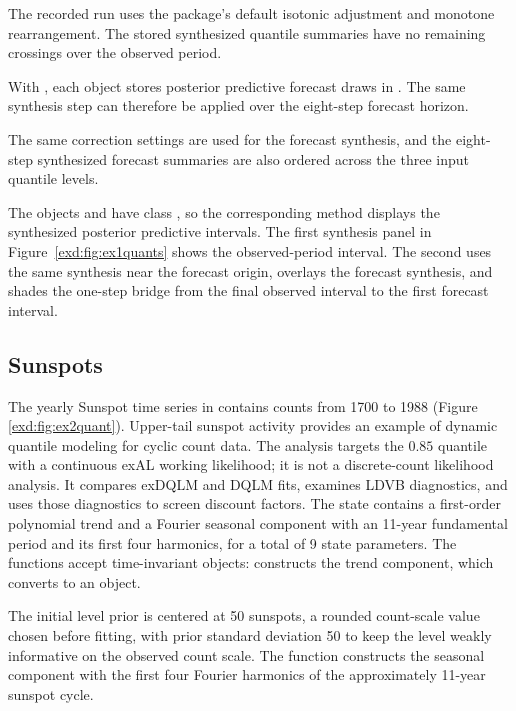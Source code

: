 The recorded run uses the package's default isotonic adjustment and monotone rearrangement. The stored synthesized quantile summaries have no remaining crossings over the observed period.

With , each object stores posterior predictive
forecast draws in . The same synthesis step can therefore be
applied over the eight-step forecast horizon.



The same correction settings are used for the forecast synthesis, and the eight-step synthesized forecast summaries are also ordered across the three input quantile levels.

The objects  and  have class , so the corresponding  method displays the synthesized posterior predictive intervals. The first synthesis panel in Figure~\ref{exd:fig:ex1quants} shows the observed-period interval. The second uses the same synthesis near the forecast origin, overlays the forecast synthesis, and shades the one-step bridge from the final observed interval to the first forecast interval.




\subsection{Sunspots}
\label{exd:sec:ex2}

The yearly Sunspot time series in  contains counts from 1700 to
1988 (Figure \ref{exd:fig:ex2quant}). Upper-tail sunspot activity provides an
example of dynamic quantile modeling for cyclic count data. The analysis
targets the \(0.85\) quantile with a continuous exAL working likelihood; it is
not a discrete-count likelihood analysis. It compares exDQLM and DQLM fits,
examines LDVB diagnostics, and uses those diagnostics to screen discount
factors. The state contains a first-order polynomial trend and a Fourier
seasonal component with an 11-year fundamental period and its first four
harmonics, for a total of 9 state parameters. The  functions accept
time-invariant  objects:  constructs the trend
component, which  converts to an  object.

The initial level prior is centered at 50 sunspots, a rounded count-scale value chosen before fitting, with prior standard deviation 50 to keep the level weakly informative on the observed count scale. The  function constructs the seasonal component with the first four Fourier harmonics of the approximately 11-year sunspot cycle.

